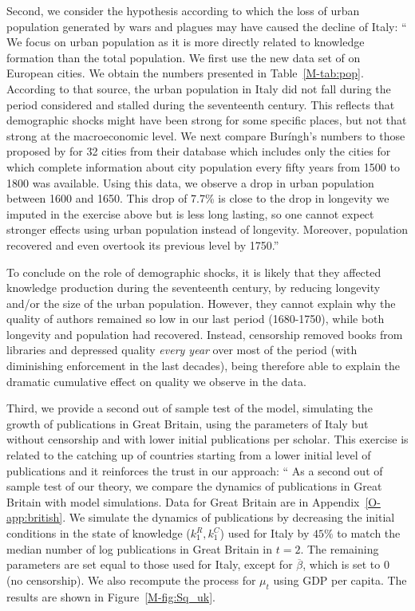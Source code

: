 \documentclass[12pt]{article}
\begin{document}
Second, we consider the hypothesis according to which the loss of urban population generated by wars and plagues may have caused the decline of Italy: `` We focus on urban population as it is more directly related to knowledge formation than the total population.  We first use the new data set of  on European cities. We obtain the numbers presented in Table~\ref{M-tab:pop}. According to that source, the urban population in Italy did not fall during the period considered and stalled during the seventeenth century. This reflects that demographic shocks might have been strong for some specific places, but not that strong at the macroeconomic level. We next compare Buríngh's numbers to those proposed by  for 32 cities from their  database which includes only the cities for which complete information about city population every fifty years from 1500 to 1800 was available. Using this data, we observe a drop in urban population between 1600 and 1650. This drop of 7.7\% is close to the drop in longevity we imputed in the exercise above but is less long lasting, so one cannot expect stronger effects using urban population instead of longevity. Moreover, population recovered and even overtook its previous level by 1750.''


To conclude on the role of demographic shocks, it is likely that they affected knowledge production during the seventeenth century, by reducing longevity and/or the size of the urban population. However, they cannot explain why the quality of authors remained so low in our last period (1680-1750), while both longevity and population had recovered. Instead, censorship removed books from libraries and depressed quality \textit{every year} over most of the period (with diminishing enforcement in the last decades), being therefore able to explain the dramatic cumulative effect on quality we observe in the data.

Third, we provide a second out of sample test of the model, simulating the growth of publications in Great Britain, using the parameters of Italy but without censorship and with lower initial publications per scholar. This exercise is related to the catching up of countries starting from a lower initial level of publications and it reinforces the trust in our approach: ``
As a second out of sample test of our theory, we compare the dynamics of publications in Great Britain with model simulations. Data for Great Britain are in Appendix~\ref{O-app:british}. We simulate the dynamics of publications by decreasing the initial conditions in the state of knowledge ($k^R_1,k^C_1$) used for Italy by $45\%$ to match the median number of log publications in Great Britain in $t=2$. The remaining parameters are set equal to those used for Italy, except for $\overline{\beta}$, which is set to 0 (no censorship). We also recompute the process for $\mu_t$ using GDP per capita. The results are shown in Figure~\ref{M-fig:Sq_uk}.
\end{document}
